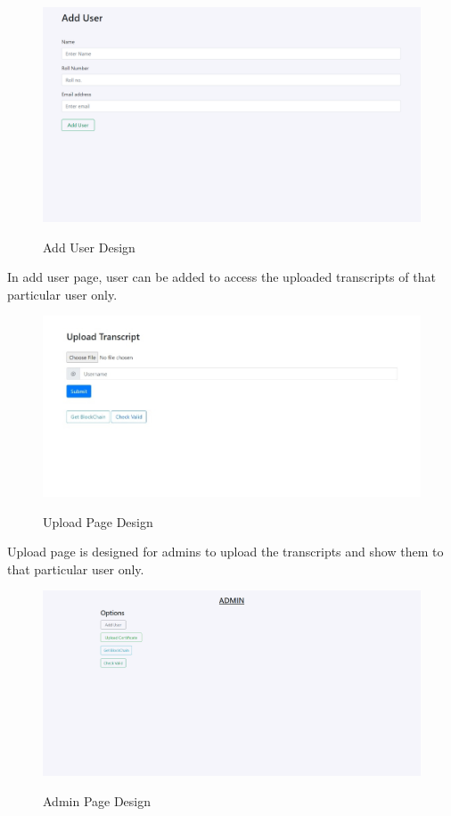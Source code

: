 \begin{figure}[H]
    \centering
    \includegraphics[scale=0.4]{images/add_user.png}\\[0.5cm]
    \caption{Add User Design}
    \label{fig:my_label}
\end{figure}

\noindent
In add user page, user can be added to access the uploaded transcripts of that particular user only.

\begin{figure}[H]
    \centering
    \includegraphics[scale=0.53]{images/upload_page.jpeg}\\[0.5cm]
    \caption{Upload Page Design}
    \label{fig:my_label}
\end{figure}

\noindent
Upload page is designed for admins to upload the transcripts and show them to that particular user only.

\begin{figure}[H]
    \centering
    \includegraphics[scale=0.32]{images/Admin Page.png}\\[0.5cm]
    \caption{Admin Page Design}
    \label{fig:Admin Page}
\end{figure}

